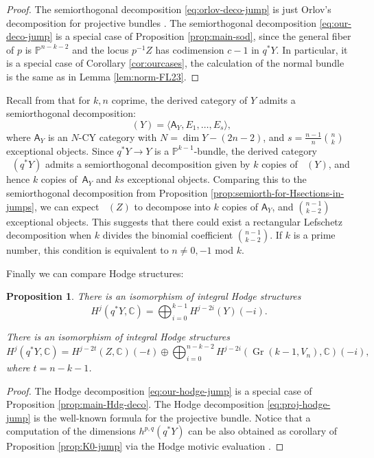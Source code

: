 \documentclass[JEP,XML,SOM,Unicode,NoEqCountersInSection]{cedram}
\theoremstyle{plain}
\newtheorem{prop}[theorem]{Proposition}
\theoremstyle{definition}
\newcommand{\cat}[1]{\mathsf{#1}}
\newcommand{\sod}[1]{\langle #1 \rangle}
\DeclareMathOperator{\Db}{{\cat{D}^{\mathrm{b}}}}
\DeclareMathOperator{\Gr}{Gr}
\newcommand{\CC}{\mathbb{C}}
\newcommand{\PP}{\mathbb{P}}
\begin{document}
\begin{proof}
The semiorthogonal decomposition \eqref{eq:orlov-deco-jump} is just Orlov's decomposition for projective
bundles \cite{orlovprojbund}. The semiorthogonal decomposition \eqref{eq:our-deco-jump} is a special
case of Proposition \ref{prop:main-sod}, since the general fiber of $p$ is $\PP^{n-k-2}$ and the
locus $p^{-1}Z$ has codimension $c-1$ in $q^*Y$. In particular, it is a special case of
Corollary \ref{cor:ourcases}, the calculation of the normal bundle is the same as in Lemma \ref{lem:norm-FL23}.
\end{proof}

Recall from \cite[Cor.\,4.4]{kuz-fractional} that for $k,n$ coprime, the derived category of $Y$
admits a semiorthogonal decomposition:
\[
\Db(Y)= \sod{\cat{A}_Y,E_1,\ldots,E_s},
\]
where $\cat{A}_Y$ is an $N$-CY category with $N=\dim Y-(2n-2)$, and $s=\frac{n-1}{n}\binom{n}{k}$ exceptional objects.
Since $q^*Y \to Y$ is a $\PP^{k-1}$-bundle, the derived category
$\Db(q^*Y)$ admits a semiorthogonal decomposition given by $k$ copies of $\Db(Y)$, and hence
$k$ copies of~$\cat{A}_Y$ and $ks$ exceptional objects. Comparing this to the semiorthogonal
decomposition from Proposition \ref{prop:semiorth-for-Hsections-in-jumps},
we can expect $\Db(Z)$ to decompose into $k$ copies of $\cat{A}_Y$,
and $\binom{n-1}{k-2}$ exceptional objects. This suggests that there could exist a rectangular Lefschetz
decomposition when $k$ divides the binomial coefficient $\binom{n-1}{k-2}$. If $k$ is a prime
number, this condition is equivalent to $n\ne 0,-1$ mod $k$.

Finally we can compare Hodge structures:

\begin{prop}\label{prop:Hodge-jump}
There is an isomorphism of integral Hodge structures
\begin{equation}\label{eq:proj-hodge-jump}
H^j(q^*Y,\CC) = \bigoplus_{i=0}^{k-1} H^{j-2i}(Y)(-i).
\end{equation}

There is an isomorphism of integral Hodge structures
\begin{equation}\label{eq:our-hodge-jump}
H^j(q^*Y,\CC) = H^{j-2t}(Z,\CC)(-t) \oplus \bigoplus_{i=0}^{n-k-2} H^{j-2i}(\Gr(k-1,V_n),\CC)(-i),
\end{equation}
where $t=n-k-1$.
\end{prop}

\begin{proof}
The Hodge decomposition \eqref{eq:our-hodge-jump} is a special case of Proposition \ref{prop:main-Hdg-deco}. The Hodge decomposition \eqref{eq:proj-hodge-jump} is the well-known formula for the projective bundle.
Notice that a computation of the dimensions $h^{p,q}(q^*Y)$ can be also obtained as corollary of Proposition \ref{prop:K0-jump} via the Hodge motivic evaluation
\cite[\S 3.2]{craw}.
\end{proof}
\end{document}
